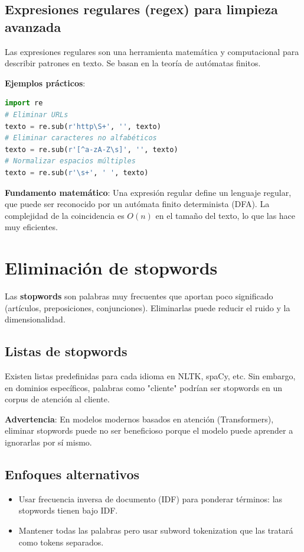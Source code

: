 \documentclass[12pt,a4paper,openany,oneside]{book}
\begin{document}
\subsection{Expresiones regulares (regex) para limpieza avanzada}
Las expresiones regulares son una herramienta matemática y computacional para describir patrones en texto. Se basan en la teoría de autómatas finitos.

\textbf{Ejemplos prácticos}:
\begin{lstlisting}[language=Python]
import re
# Eliminar URLs
texto = re.sub(r'http\S+', '', texto)
# Eliminar caracteres no alfabéticos
texto = re.sub(r'[^a-zA-Z\s]', '', texto)
# Normalizar espacios múltiples
texto = re.sub(r'\s+', ' ', texto)
\end{lstlisting}

\textbf{Fundamento matemático}: Una expresión regular define un lenguaje regular, que puede ser reconocido por un autómata finito determinista (DFA). La complejidad de la coincidencia es \(O(n)\) en el tamaño del texto, lo que las hace muy eficientes.

\section{Eliminación de stopwords}

Las \textbf{stopwords} son palabras muy frecuentes que aportan poco significado (artículos, preposiciones, conjunciones). Eliminarlas puede reducir el ruido y la dimensionalidad.

\subsection{Listas de stopwords}
Existen listas predefinidas para cada idioma en NLTK, spaCy, etc. Sin embargo, en dominios específicos, palabras como "cliente" podrían ser stopwords en un corpus de atención al cliente.

\textbf{Advertencia}: En modelos modernos basados en atención (Transformers), eliminar stopwords puede no ser beneficioso porque el modelo puede aprender a ignorarlas por sí mismo.

\subsection{Enfoques alternativos}
\begin{itemize}
    \item Usar frecuencia inversa de documento (IDF) para ponderar términos: las stopwords tienen bajo IDF.
    \item Mantener todas las palabras pero usar subword tokenization que las tratará como tokens separados.
\end{itemize}
\end{document}
